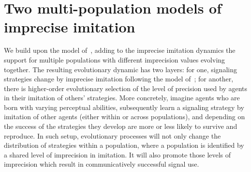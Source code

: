 \documentclass[a4paper]{article}
\begin{document}


\section{Two multi-population models of imprecise imitation}
\label{sec:multi-population-model}
We build upon the model of~\textcite{franke_vagueness_2017}, adding to the imprecise imitation dynamics the support for multiple populations with different imprecision values evolving together.
The resulting evolutionary dynamic has two layers: for one, signaling strategies change by imprecise imitation following the model of~\textcite{franke_vagueness_2017}; for another, there is higher-order evolutionary selection of the level of precision used by agents in their imitation of others' strategies.
More concretely, imagine agents who are born with varying perceptual abilities, subsequently learn a signaling strategy by imitation of other agents (either within or across populations), and depending on the success of the strategies they develop are more or less likely to survive and reproduce.
In such setup, evolutionary processes will not only change the distribution of strategies within a population, where a population is identified by a shared level of imprecision in imitation.
It will also promote those levels of imprecision which result in communicatively successful signal use.
\end{document}
